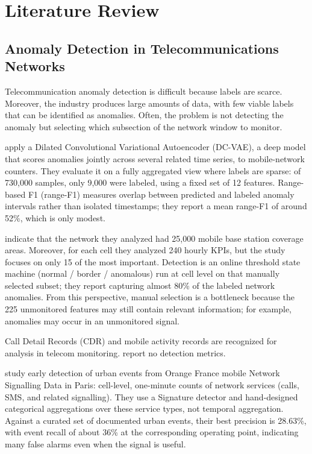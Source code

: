\section{Literature Review}

\subsection{Anomaly Detection in Telecommunications Networks}

Telecommunication anomaly detection is difficult because labels are scarce.
Moreover, the industry produces large amounts of data, with few viable labels that can be identified as anomalies.
Often, the problem is not detecting the anomaly but selecting which subsection of the network window to monitor.

\textcite{gonzalez2024one} apply a Dilated Convolutional Variational Autoencoder (DC-\ac{VAE}), a deep model that scores anomalies jointly across several related time series, to mobile-network counters.
They evaluate it on a fully aggregated view where labels are sparse: of 730{,}000 samples, only 9{,}000 were labeled, using a fixed set of 12 features.
Range-based F1 (range-F1) measures overlap between predicted and labeled anomaly intervals rather than isolated timestamps; they report a mean range-F1 of around 52\%, which is only modest.

\textcite{burgueno2020online} indicate that the network they analyzed had 25{,}000 mobile base station coverage areas.
Moreover, for each cell they analyzed 240 hourly \ac{KPI}s, but the study focuses on only 15 of the most important.
Detection is an online threshold state machine (normal / border / anomalous) run at cell level on that manually selected subset; they report capturing almost 80\% of the labeled network anomalies.
From this perspective, manual selection is a bottleneck because the 225 unmonitored features may still contain relevant information; for example, anomalies may occur in an unmonitored signal.

Call Detail Records (\ac{CDR}) and mobile activity records are recognized for analysis in telecom monitoring.
\textcite{sultan2018cdr} report no detection metrics.

\textcite{lemaire2024early} study early detection of urban events from Orange France mobile Network Signalling Data in Paris: cell-level, one-minute counts of network services (calls, SMS, and related signalling).
They use a Signature detector and hand-designed categorical aggregations over these service types, not temporal aggregation.
Against a curated set of documented urban events, their best precision is 28.63\%, with event recall of about 36\% at the corresponding operating point, indicating many false alarms even when the signal is useful.

